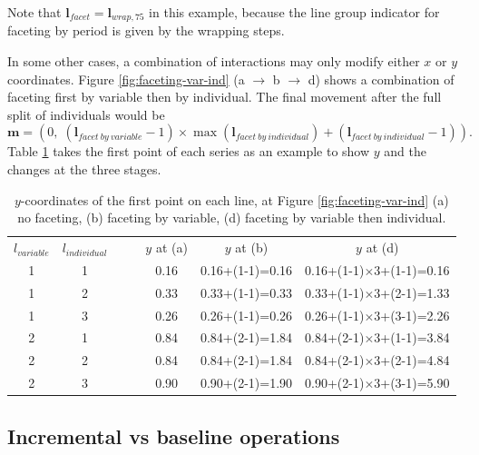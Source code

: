 \documentclass[12pt]{article}
\providecommand{\tabularnewline}{\\}
\begin{document}
Note that $\mathbf{l}{}_{facet} = \mathbf{l}{}_{wrap,75}$
in this example, because the line group indicator for
faceting by period is given by the wrapping steps.

In some other cases, a combination of interactions may
only modify either $x$ or $y$ coordinates. Figure
\ref{fig:faceting-var-ind} (a $\rightarrow$ b $\rightarrow$ d)
shows a combination of faceting first by variable then
by individual. The final movement after the full split
of individuals would be
\[
\mathbf{m} = (0, \; (\mathbf{l}{}_{facet~by~variable}-1)\times \max(\mathbf{l}{}_{facet~by~individual})+(\mathbf{l}{}_{facet~by~individual}-1)).
\]
Table \ref{tab:additive-faceting} takes the first point
of each series as an example to show $y$ and the changes
at the three stages.

\begin{center}
\begin{table}[h]
\begin{centering}
\begin{tabular}{|c|c|cc|c||c||c|}
\cline{1-2} \cline{5-7}
$l_{variable}$ & $l_{individual}$ &  &  & $y$ at (a) & $y$ at (b) & $y$ at (d)\tabularnewline
\cline{1-2} \cline{5-7}
1 & 1 &  &  & 0.16 & 0.16+(1-1)=0.16 & 0.16+(1-1)$\times$3+(1-1)=0.16\tabularnewline
\cline{1-2} \cline{5-7}
1 & 2 &  &  & 0.33 & 0.33+(1-1)=0.33 & 0.33+(1-1)$\times$3+(2-1)=1.33\tabularnewline
\cline{1-2} \cline{5-7}
1 & 3 &  &  & 0.26 & 0.26+(1-1)=0.26 & 0.26+(1-1)$\times$3+(3-1)=2.26\tabularnewline
\cline{1-2} \cline{5-7}
2 & 1 &  &  & 0.84 & 0.84+(2-1)=1.84 & 0.84+(2-1)$\times$3+(1-1)=3.84\tabularnewline
\cline{1-2} \cline{5-7}
2 & 2 &  &  & 0.84 & 0.84+(2-1)=1.84 & 0.84+(2-1)$\times$3+(2-1)=4.84\tabularnewline
\cline{1-2} \cline{5-7}
2 & 3 &  &  & 0.90 & 0.90+(2-1)=1.90 & 0.90+(2-1)$\times$3+(3-1)=5.90\tabularnewline
\cline{1-2} \cline{5-7}
\end{tabular}
\end{centering}
\caption{\label{tab:additive-faceting}$y$-coordinates of the
first point on each line, at Figure \ref{fig:faceting-var-ind}
(a) no faceting, (b) faceting by variable, (d) faceting by
variable then individual.}
\end{table}
\end{center}

\subsection{Incremental vs baseline operations\label{sub:Two-procedures}}
\end{document}
